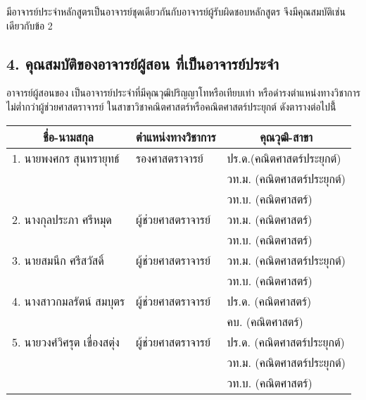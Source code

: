 {\printprogram{}  มีอาจารย์ประจำหลักสูตรเป็นอาจารย์ชุดเดียวกันกับอาจารย์ผู้รับผิดชอบหลักสูตร จึงมีคุณสมบัติเช่นเดียวกับข้อ 2\\

\printselfeval

\subsection*{4. คุณสมบัติของอาจารย์ผู้สอน ที่เป็นอาจารย์ประจำ }

	อาจารย์ผู้สอนของ\printprogram{} เป็นอาจารย์ประจำที่มีคุณวุฒิปริญญาโทหรือเทียบเท่า หรือดำรงตำแหน่งทางวิชาการไม่ต่ำกว่าผู้ช่วยศาสตราจารย์ ในสาขาวิชาคณิตศาสตร์หรือคณิตศาสตร์ประยุกต์ ดังตารางต่อไปนี้้
\begin{center}
	{\small 
		\begin{longtable}{|p{}|p{}|p{}|}
			\hline
			\multicolumn{1}{|c|}{\textbf{ชื่อ-นามสกุล}} & \multicolumn{1}{c}{\textbf{ตำแหน่งทางวิชาการ}} & \multicolumn{1}{|c|}{\textbf{คุณวุฒิ-สาขา}} 
			\\\hline
			\endhead
			1. นายพงศกร สุนทรายุทธ์
			&รองศาสตราจารย์	&ปร.ด.(คณิตศาสตร์ประยุกต์) \\
			&&วท.ม. (คณิตศาสตร์ประยุกต์)\\
			&& วท.บ. (คณิตศาสตร์)\\
			\hline
			
			
			2. นางกุลประภา ศรีหมุด
			&ผู้ช่วยศาสตราจารย์&วท.ม. (คณิตศาสตร์)\\
			&&วท.บ. (คณิตศาสตร์)\\	
			\hline
			
			
			3. นายสมนึก ศรีสวัสดิ์
			&ผู้ช่วยศาสตราจารย์& วท.ม. (คณิตศาสตร์ประยุกต์)\\
			&&วท.บ. (คณิตศาสตร์)\\
			\hline
			
			
			4. นางสาวกมลรัตน์ สมบุตร
			&ผู้ช่วยศาสตราจารย์&ปร.ด. (คณิตศาสตร์)\\
			&&คบ. (คณิตศาสตร์)\\
			\hline
			
			
			5. นายวงศ์วิศรุต เขื่องสตุ่ง
			&ผู้ช่วยศาสตราจารย์&ปร.ด. (คณิตศาสตร์ประยุกต์)\\
			&&วท.ม. (คณิตศาสตร์ประยุกต์)\\
			&& วท.บ. (คณิตศาสตร์)\\
			\hline
			

\end{longtable}}
\end{center}}

